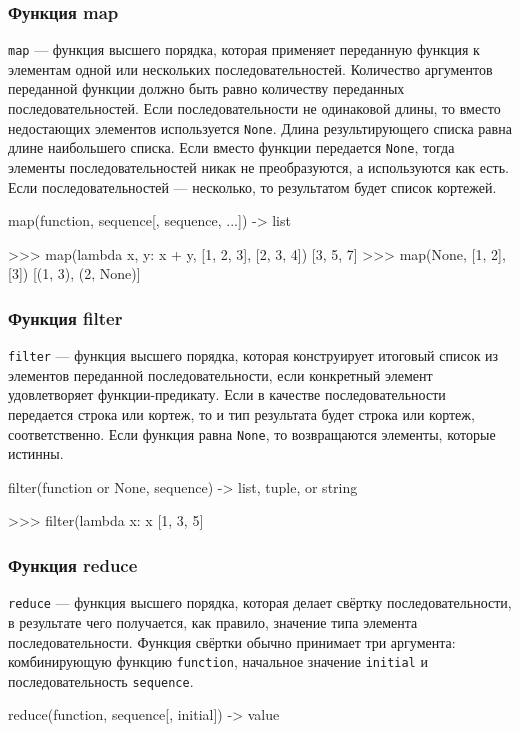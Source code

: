 \subsubsection{Функция map}
\lstinline{map} --- функция высшего порядка, которая применяет переданную функция к элементам одной или нескольких последовательностей. Количество аргументов переданной функции должно быть равно количеству переданных последовательностей. Если последовательности не одинаковой длины, то вместо недостающих элементов используется \lstinline{None}. Длина результирующего списка равна длине наибольшего списка. Если вместо функции передается \lstinline{None}, тогда элементы последовательностей никак не преобразуются, а используются как есть. Если последовательностей --- несколько, то результатом будет список кортежей.
\begin{pylst}{}{}
map(function, sequence[, sequence, ...]) -> list

>>> map(lambda x, y: x + y, [1, 2, 3], [2, 3, 4])
[3, 5, 7]
>>> map(None, [1, 2], [3])
[(1, 3), (2, None)]
\end{pylst}

\subsubsection{Функция filter}
\lstinline{filter} --- функция высшего порядка, которая конструирует итоговый список из элементов переданной последовательности, если конкретный элемент удовлетворяет функции-предикату. Если в качестве последовательности передается строка или кортеж, то и тип результата будет строка или кортеж, соответственно. Если функция равна \lstinline{None}, то возвращаются элементы, которые истинны.
\begin{pylst}{}{}
filter(function or None, sequence) -> list, tuple, or string

>>> filter(lambda x: x %
[1, 3, 5]
\end{pylst}

\subsubsection{Функция reduce}
\lstinline{reduce} --- функция высшего порядка, которая делает свёртку последовательности, в результате чего получается, как правило, значение типа элемента последовательности. Функция свёртки обычно принимает три аргумента: комбинирующую функцию \lstinline{function}, начальное значение \lstinline{initial} и последовательность \lstinline{sequence}.
\begin{pylst}{}{}
reduce(function, sequence[, initial]) -> value
\end{pylst}

